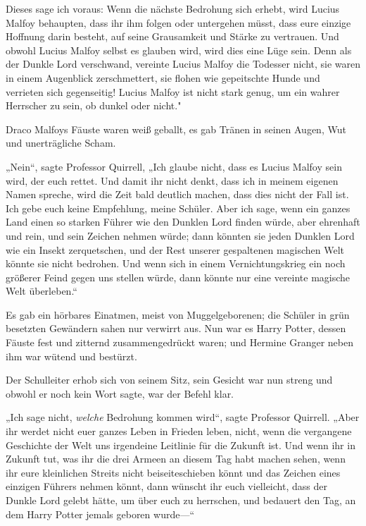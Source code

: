 {Dieses sage ich voraus: Wenn die nächste Bedrohung sich erhebt, wird Lucius Malfoy behaupten, dass ihr ihm folgen oder untergehen müsst, dass eure einzige Hoffnung darin besteht, auf seine Grausamkeit und Stärke zu vertrauen. Und obwohl Lucius Malfoy selbst es glauben wird, wird dies eine Lüge sein. Denn als der Dunkle Lord verschwand, vereinte Lucius Malfoy die Todesser nicht, sie waren in einem Augenblick zerschmettert, sie flohen wie gepeitschte Hunde und verrieten sich gegenseitig! Lucius Malfoy ist nicht stark genug, um ein wahrer Herrscher zu sein, ob dunkel oder nicht."

Draco Malfoys Fäuste waren weiß geballt, es gab Tränen in seinen Augen, Wut und unerträgliche Scham.

„Nein“, sagte Professor Quirrell, „Ich glaube nicht, dass es Lucius Malfoy sein wird, der euch rettet. Und damit ihr nicht denkt, dass ich in meinem eigenen Namen spreche, wird die Zeit bald deutlich machen, dass dies nicht der Fall ist. Ich gebe euch keine Empfehlung, meine Schüler. Aber ich sage, wenn ein ganzes Land einen so starken Führer wie den Dunklen Lord finden würde, aber ehrenhaft und rein, und sein Zeichen nehmen würde; dann könnten sie jeden Dunklen Lord wie ein Insekt zerquetschen, und der Rest unserer gespaltenen magischen Welt könnte sie nicht bedrohen. Und wenn sich in einem Vernichtungskrieg ein noch größerer Feind gegen uns stellen würde, dann könnte nur eine vereinte magische Welt überleben.“

Es gab ein hörbares Einatmen, meist von Muggelgeborenen; die Schüler in grün besetzten Gewändern sahen nur verwirrt aus. Nun war es Harry Potter, dessen Fäuste fest und zitternd zusammengedrückt waren; und Hermine Granger neben ihm war wütend und bestürzt.

Der Schulleiter erhob sich von seinem Sitz, sein Gesicht war nun streng und obwohl er noch kein Wort sagte, war der Befehl klar.

„Ich sage nicht, \emph{welche} Bedrohung kommen wird“, sagte Professor Quirrell. „Aber ihr werdet nicht euer ganzes Leben in Frieden leben, nicht, wenn die vergangene Geschichte der Welt uns irgendeine Leitlinie für die Zukunft ist. Und wenn ihr in Zukunft tut, was ihr die drei Armeen an diesem Tag habt machen sehen, wenn ihr eure kleinlichen Streits nicht beiseiteschieben könnt und das Zeichen eines einzigen Führers nehmen könnt, dann wünscht ihr euch vielleicht, dass der Dunkle Lord gelebt hätte, um über euch zu herrschen, und bedauert den Tag, an dem Harry Potter jemals geboren wurde—“

}
